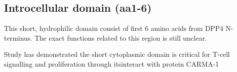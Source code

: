 \subsection{Introcellular domain (aa1-6)}

This short, hydrophilic domain consist of first 6 amino acids from DPP4 N-terminus. The exact functions related to this region is still unclear.

Study has demonstrated the short cytoplasmic domain is critical for T-cell signalling and proliferation through itsinteract with protein CARMA-1 